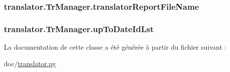 \subsubsection[{translator\+Report\+File\+Name}]{\setlength{\rightskip}{0pt plus 5cm}translator.\+Tr\+Manager.\+translator\+Report\+File\+Name}\label{classtranslator_1_1_tr_manager_a3934327a6aca42c4bc9f696c3a3a964d}
\hypertarget{classtranslator_1_1_tr_manager_ab2ee080b368e837b1ccd27b606d2874e}{}
\subsubsection[{up\+To\+Date\+Id\+Lst}]{\setlength{\rightskip}{0pt plus 5cm}translator.\+Tr\+Manager.\+up\+To\+Date\+Id\+Lst}\label{classtranslator_1_1_tr_manager_ab2ee080b368e837b1ccd27b606d2874e}


La documentation de cette classe a été générée à partir du fichier suivant \+:\begin{DoxyCompactItemize}
\item 
doc/\hyperlink{translator_8py}{translator.\+py}\end{DoxyCompactItemize}
